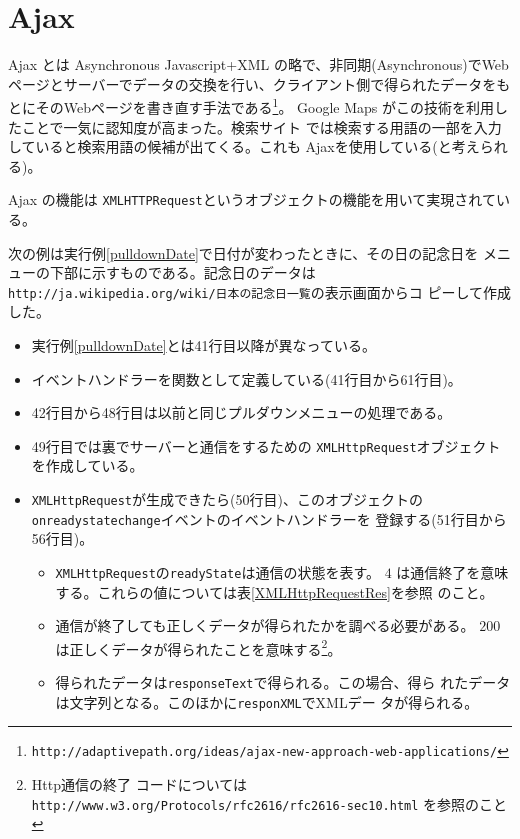\section{Ajax}
Ajax とは Asynchronous Javascript+XML の略で、非同期(Asynchronous)でWeb
ページとサーバーでデータの交換を行い、クライアント側で得られたデータをも
とにそのWebページを書き直す手法である\footnote{%
\texttt{http://adaptivepath.org/ideas/ajax-new-approach-web-applications/}}。
Google Maps がこの技術を利用したことで一気に認知度が高まった。検索サイト
では検索する用語の一部を入力していると検索用語の候補が出てくる。これも
Ajaxを使用している(と考えられる)。

Ajax の機能は \texttt{XMLHTTPRequest}というオブジェクトの機能を用いて実現されている。
\begin{Exec}\upshape\label{WhatDay}
次の例は実行例\ref{pulldownDate}で日付が変わったときに、その日の記念日を
 メニューの下部に示すものである。記念日のデータは
 \texttt{http://ja.wikipedia.org/wiki/日本の記念日一覧}の表示画面からコ
 ピーして作成した。
\begin{itemize}
 \item 実行例\ref{pulldownDate}とは41行目以降が異なっている。
 \item イベントハンドラーを関数として定義している(41行目から61行目)。
 \item 42行目から48行目は以前と同じプルダウンメニューの処理である。
 \item 49行目では裏でサーバーと通信をするための
       \texttt{XMLHttpRequest}オブジェクトを作成している。
 \item \texttt{XMLHttpRequest}が生成できたら(50行目)、このオブジェクトの
       \texttt{onreadystatechange}イベントのイベントハンドラーを
       登録する(51行目から56行目)。
 \begin{itemize}
  \item \texttt{XMLHttpRequest}の\texttt{readyState}は通信の状態を表す。
	$4$ は通信終了を意味する。これらの値については表\ref{XMLHttpRequestRes}を参照
				のこと。
  \item 通信が終了しても正しくデータが得られたかを調べる必要がある。
	$200$ は正しくデータが得られたことを意味する\footnote{Http通信の終了
				コードについては
				\texttt{http://www.w3.org/Protocols/rfc2616/rfc2616-sec10.html}
				を参照のこと}。
  \item 得られたデータは\texttt{responseText}で得られる。この場合、得ら
	れたデータは文字列となる。このほかに\texttt{responXML}でXMLデー
	タが得られる。
 \end{itemize}

\end{itemize}
\end{Exec}
